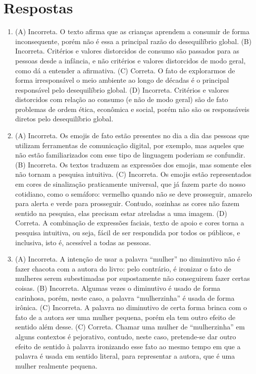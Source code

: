 \chapter{Respostas}
\pagestyle{plain}
\footnotesize

\pagecolor{gray!40}


\begin{enumerate}
\item (A) Incorreta. O texto afirma que as crianças aprendem a consumir de forma inconsequente, porém não é essa a principal razão do desequilíbrio global.
(B) Incorreta. Critérios e valores distorcidos de consumo são passados para as pessoas desde a infância, e não critérios e valores distorcidos de modo geral, como dá a entender a afirmativa.
(C) Correta. O fato de explorarmos de forma irresponsável o meio ambiente ao longo de décadas é o principal responsável pelo desequilíbrio global.
(D) Incorreta. Critérios e valores distorcidos com relação ao consumo (e não de modo geral) são de fato problemas de ordem ética, econômica e social, porém não são os responsáveis diretos pelo desequilíbrio global.

\item (A) Incorreta. Os emojis de fato estão presentes no dia a dia das pessoas
que utilizam ferramentas de comunicação digital, por exemplo, mas
aqueles que não estão familiarizados com esse tipo de linguagem poderiam
se confundir.
(B) Incorreta. Os textos traduzem as expressões dos emojis, mas somente
eles não tornam a pesquisa intuitiva.
(C) Incorreta. Os emojis estão representados em cores de sinalização
praticamente universal, que já fazem parte do nosso cotidiano, como o
semáforo: vermelho quando não se deve prosseguir, amarelo para alerta e
verde para prosseguir. Contudo, sozinhas as cores não fazem sentido na
pesquisa, elas precisam estar atreladas a uma imagem.
(D) Correta. A combinação de expressões faciais, texto de apoio e cores
torna a pesquisa intuitiva, ou seja, fácil de ser respondida por todos
os públicos, e inclusiva, isto é, acessível a todas as pessoas.

\item (A) Incorreta. A intenção de usar a palavra ``mulher'' no diminutivo não
é fazer chacota com a autora do livro: pelo contrário, é ironizar o fato
de mulheres serem subestimadas por supostamente não conseguirem fazer
certas coisas.
(B) Incorreta. Algumas vezes o diminutivo é usado de forma carinhosa,
porém, neste caso, a palavra ``mulherzinha'' é usada de forma irônica.
(C) Incorreta. A palavra no diminutivo de certa forma brinca com o fato
de a autora ser uma mulher pequena, porém ela tem outro efeito de
sentido além desse.
(C) Correta. Chamar uma mulher de ``mulherzinha'' em alguns contextos é
pejorativo, contudo, neste caso, pretende-se dar outro efeito de sentido
à palavra ironizando esse fato ao mesmo tempo em que a palavra é usada
em sentido literal, para representar a autora, que é uma mulher
realmente pequena.
\end{enumerate}


